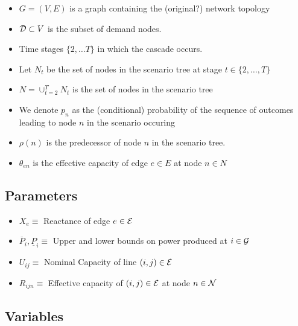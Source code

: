 \begin{itemize}
\item $G=(V,E)$ is a graph containing the (original?) network topology
\item $\mathcal{D} \subset V$ is the subset of demand nodes.
\item Time stages $\{2,\ldots T\}$ in which the cascade occurs.
\item Let $N_t$ be the set of nodes in the scenario tree at stage $t \in
\{2, \ldots, T\}$
\item $N = \cup_{t=2}^T N_t$ is the set of nodes in the scenario tree
\item We denote $p_n$ as the (conditional) probability of
the sequence of outcomes leading to node $n$ in the scenario occuring
\item $\rho(n)$ is the predecessor of node $n$ in the scenario tree.
\item $\theta_{en}$ is the effective capacity of edge $e \in E$ at
  node $n \in N$
\end{itemize}




\subsection{Parameters}

\begin{itemize}
\item $X_e \equiv $ Reactance of edge $e \in \mathcal{E}$
\item $ \overline{P}_i, \underline{P}_i \equiv $ Upper and lower bounds on power produced at $ i \in \mathcal{G} $
\item $ U_{ij} \equiv$ Nominal Capacity of line $(i,j) \in \mathcal{E}$
\item $ R_{ijn} \equiv$  Effective capacity of $(i,j) \in \mathcal{E}$ at node $n \in \mathcal{N}$
\end{itemize}


\subsection{Variables}

